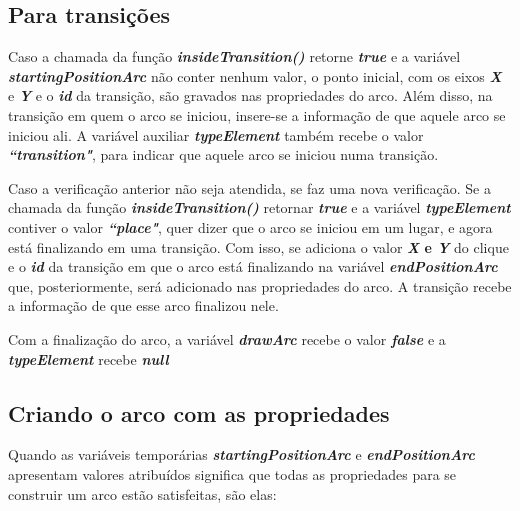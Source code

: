 \documentclass[
	12pt,				%
	openright,			%
	oneside,			%
	a4paper,			%
	english,			%
	brazil				%
	]{abntex2}
\theoremstyle{doispontos}
\begin{document}
\subsection{Para transições}

Caso a chamada da função \textbf{\textit{insideTransition()}} retorne \textbf{\textit{true}} e a variável \textbf{\textit{startingPositionArc}} não conter nenhum valor, o ponto inicial, com os eixos \textbf{\textit{X}} e \textbf{\textit{Y}} e o \textbf{\textit{id}} da transição, são gravados nas propriedades do arco. Além disso, na transição em quem o arco se iniciou, insere-se a informação de que aquele arco se iniciou ali. A variável auxiliar \textbf{\textit{typeElement}} também recebe o valor \textbf{\textit{``transition"}}, para indicar que aquele arco se iniciou numa transição. 

Caso a verificação anterior não seja atendida, se faz uma nova verificação. Se a chamada da função \textbf{\textit{insideTransition()}} retornar \textbf{\textit{true}} e a variável \textbf{\textit{typeElement}} contiver o valor \textbf{\textit{``place"}}, quer dizer que o arco se iniciou em um lugar, e agora está finalizando em uma transição. Com isso, se adiciona o valor \textbf{\textit{X} e \textbf{\textit{Y}}} do clique e o \textbf{\textit{id}} da transição em que o arco está finalizando na variável \textbf{\textit{endPositionArc}} que, posteriormente, será adicionado nas propriedades do arco. A transição recebe a informação de que esse arco finalizou nele.

Com a finalização do arco, a variável \textbf{\textit{drawArc}} recebe o valor \textbf{\textit{false}} e a \textbf{\textit{typeElement}} recebe \textbf{\textit{null}}



\subsection{Criando o arco com as propriedades}

Quando as variáveis temporárias \textbf{\textit{startingPositionArc}} e \textbf{\textit{endPositionArc}} apresentam valores atribuídos significa que todas as propriedades para se construir um arco estão satisfeitas, são elas:
\end{document}
